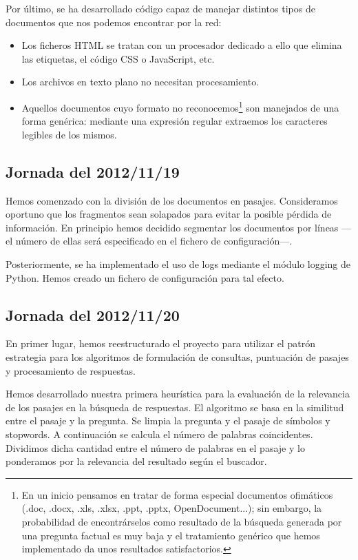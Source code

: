 \documentclass[12pt,a4paper,titlepage]{article}
\begin{document}
Por último, se ha desarrollado código capaz de manejar distintos tipos de documentos que nos podemos encontrar por la red:
\begin{itemize}
\item Los ficheros HTML se tratan con un procesador dedicado a ello que elimina las etiquetas, el código CSS o JavaScript, etc.
\item Los archivos en texto plano no necesitan procesamiento.
\item Aquellos documentos cuyo formato no reconocemos\footnote{En un inicio pensamos en tratar de forma especial documentos ofimáticos (.doc, .docx, .xls, .xlsx, .ppt, .pptx, OpenDocument...); sin embargo, la probabilidad de encontrárselos como resultado de la búsqueda generada por una pregunta factual es muy baja y el tratamiento genérico que hemos implementado da unos resultados satisfactorios.} son manejados de una forma genérica: mediante una expresión regular extraemos los caracteres legibles de los mismos.
\end{itemize}

\subsection{Jornada del 2012/11/19}
Hemos comenzado con la división de los documentos en pasajes. Consideramos oportuno que los fragmentos sean solapados para evitar la posible pérdida de información. En principio hemos decidido segmentar los documentos por líneas ---el número de ellas será especificado en el fichero de configuración---.

Posteriormente, se ha implementado el uso de logs mediante el módulo logging de Python. Hemos creado un fichero de configuración para tal efecto.

\subsection{Jornada del 2012/11/20}
En primer lugar, hemos reestructurado el proyecto para utilizar el patrón estrategia para los algoritmos de formulación de consultas, puntuación de pasajes y procesamiento de respuestas.

Hemos desarrollado nuestra primera heurística para la evaluación de la relevancia de los pasajes en la búsqueda de respuestas. El algoritmo se basa en la similitud entre el pasaje y la pregunta. Se limpia la pregunta y el pasaje de símbolos y stopwords. A continuación se calcula el número de palabras coincidentes. Dividimos dicha cantidad entre el número de palabras en el pasaje y lo ponderamos por la relevancia del resultado según el buscador.
\end{document}
